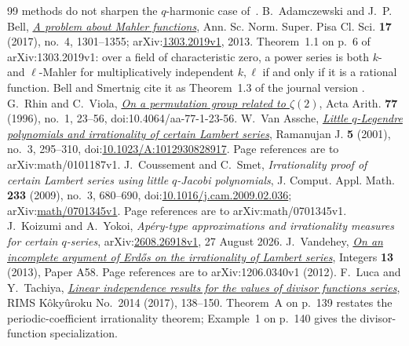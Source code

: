\begin{thebibliography}{99}
  methods do not sharpen the \(q\)-harmonic case of~\cite{zudilin2004}.
 B.~Adamczewski and J.~P. Bell,
  \href{https://arxiv.org/abs/1303.2019v1}{\emph{A problem about Mahler
  functions}}, Ann. Sc. Norm. Super. Pisa Cl. Sci. \textbf{17} (2017), no.~4,
  1301--1355; arXiv:\href{https://arxiv.org/abs/1303.2019v1}{1303.2019v1}, 2013.
  Theorem~1.1 on p.~6 of arXiv:1303.2019v1: over a field of characteristic
  zero, a power series is both \(k\)- and \(\ell\)-Mahler for multiplicatively
  independent \(k,\ell\) if and only if it is a rational function.  Bell and
  Smertnig cite it as Theorem~1.3 of the journal version
  \cite[Thm.~2.5, p.~5]{bellsmertnig2026}.
 G.~Rhin and C.~Viola,
  \href{https://geodesic.mathdoc.fr/articles/10.4064/aa-77-1-23-56/}
  {\emph{On a permutation group related to $\zeta(2)$}},
  Acta Arith. \textbf{77} (1996), no.~1, 23--56,
  doi:10.4064/aa-77-1-23-56.
 W.~Van Assche,
  \href{https://arxiv.org/abs/math/0101187v1}{\emph{Little \(q\)-Legendre
  polynomials and irrationality of certain Lambert series}},
  Ramanujan J. \textbf{5} (2001), no.~3, 295--310,
  doi:\href{https://doi.org/10.1023/A:1012930828917}{10.1023/A:1012930828917}.
  Page references are to arXiv:math/0101187v1.
 J.~Coussement and C.~Smet, \emph{Irrationality
  proof of certain Lambert series using little \(q\)-Jacobi polynomials},
  J. Comput. Appl. Math. \textbf{233} (2009), no.~3, 680--690,
  doi:\href{https://doi.org/10.1016/j.cam.2009.02.036}{10.1016/j.cam.2009.02.036};
  arXiv:\href{https://arxiv.org/abs/math/0701345v1}{math/0701345v1}.
  Page references are to arXiv:math/0701345v1.
 J.~Koizumi and A.~Yokoi, \emph{Ap\'ery-type
  approximations and irrationality measures for certain \(q\)-series},
  arXiv:\href{https://arxiv.org/abs/2608.26918v1}{2608.26918v1},
  27 August 2026.
 J.~Vandehey,
  \href{https://arxiv.org/abs/1206.0340v1}{\emph{On an incomplete argument of
  Erd\H{o}s on the irrationality of Lambert series}}, Integers
  \textbf{13} (2013), Paper A58. Page references are to
  arXiv:1206.0340v1 (2012).
 F.~Luca and Y.~Tachiya,
  \href{https://www.kurims.kyoto-u.ac.jp/~kyodo/kokyuroku/contents/pdf/2014-14.pdf}
  {\emph{Linear independence results for the values of divisor functions
  series}}, RIMS K\^oky\^uroku No.~2014 (2017), 138--150.
  Theorem~A on p.~139 restates the periodic-coefficient irrationality theorem;
  Example~1 on p.~140 gives the divisor-function specialization.

\end{thebibliography}
